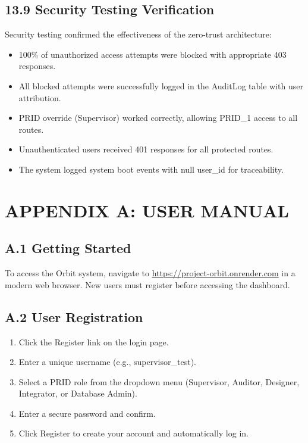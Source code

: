 ﻿\documentclass[12pt]{article}
\def\normaltext{\fontsize{12pt}{18pt}\color{secondary}}
\begin{document}
\subsection*{13.9 Security Testing Verification}
Security testing confirmed the effectiveness of the zero-trust architecture:
\begin{itemize}
\item 100\% of unauthorized access attempts were blocked with appropriate 403 responses.
\item All blocked attempts were successfully logged in the AuditLog table with user attribution.
\item PRID override (Supervisor) worked correctly, allowing PRID\_1 access to all routes.
\item Unauthenticated users received 401 responses for all protected routes.
\item The system logged system boot events with null user\_id for traceability.
\end{itemize}
\newpage

\section*{{\color{primary}APPENDIX A: USER MANUAL}}
\normaltext

\subsection*{A.1 Getting Started}
To access the Orbit system, navigate to \url{https://project-orbit.onrender.com} in a modern web browser. New users must register before accessing the dashboard.

\subsection*{A.2 User Registration}
\begin{enumerate}
\item Click the Register link on the login page.
\item Enter a unique username (e.g., supervisor\_test).
\item Select a PRID role from the dropdown menu (Supervisor, Auditor, Designer, Integrator, or Database Admin).
\item Enter a secure password and confirm.
\item Click Register to create your account and automatically log in.
\end{enumerate}
\end{document}
